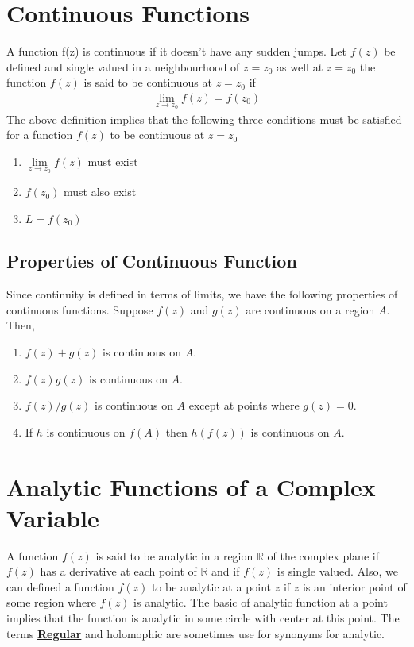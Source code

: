 \documentclass[12pt]{report}
\newcommand{\ubt}[1]{\textbf{\underline{#1}}}
\newcommand{\real}{ \mathbb{R}}
\begin{document}
	\section{Continuous Functions}
	A function f(z) is continuous if it doesn't have any sudden jumps. Let $f(z)$ be defined and single valued in a neighbourhood of $z=z_0$ as well at $z=z_0$ the function $f(z)$ is said to be continuous at $z=z_0$ if
	\begin{eqnarray}
		\lim\limits_{z\rightarrow z_0} f(z) = f(z_0)\label{eq:2_5}
	\end{eqnarray}
	The above definition implies that the following three conditions must be satisfied for a function $f(z)$ to be continuous at $z=z_0$
	\begin{enumerate}
		\item $\lim\limits_{z\rightarrow z_0} f(z)$ must exist
		\item $f(z_0)$ must also exist
		\item $L = f(z_0)$
	\end{enumerate}
	
	\subsection{Properties of Continuous Function}
	Since continuity is defined in terms of limits, we have the following properties of continuous functions. Suppose $f(z)$ and $g(z)$ are continuous on a region $A$. Then,
	\begin{enumerate}
		\item $f(z)+g(z)$ is continuous on $A$.
		\item $f(z)g(z)$ is continuous on $A$.
		\item $f(z)/g(z)$ is continuous on $A$ except at points where $g(z)=0$.
		\item If $h$ is continuous on $f(A)$ then $h(f(z))$ is continuous on $A$.
	\end{enumerate}

	\section{Analytic Functions of a Complex Variable}
	A function $f(z)$ is said to be analytic in a region $\real$ of the complex plane if $f(z)$ has a derivative at each point of $\real$ and if $f(z)$ is single valued. Also, we can defined a function $f(z)$ to be analytic at a point $z$ if $z$ is an interior point of some region where $f(z)$ is analytic. The basic of analytic function at a point implies that the function is analytic in some circle with center at this point. The terms \ubt{Regular} and holomophic are sometimes use for synonyms for analytic.\\
	
\end{document}
